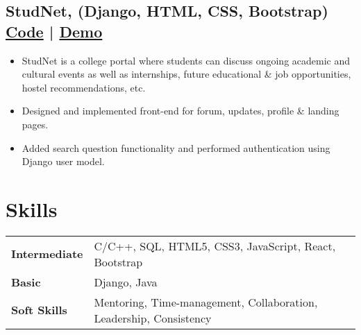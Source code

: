 \documentclass[a4,10pt]{article}
\newenvironment{zitemize}{
\begin{itemize}\itemsep0pt \parskip0pt \parsep1pt}
{\end{itemize}\vspace{-0.5cm}}
\newcommand{\hskills}[1]{
\textbf{\bfseries #1} }
\begin{document}
\subsection*{StudNet, {\normalsize\normalfont (Django, HTML, CSS, Bootstrap)} \hfill {\href{https://github.com/DevelopersLeague/StudNet}{Code} } | {\href{https://stud-net.herokuapp.com/}{Demo} }} 
    \begin{zitemize}
        \item StudNet is a college portal where students can discuss ongoing academic and cultural events as well as 
        internships, future educational \& job opportunities, hostel recommendations, etc. 
        \item Designed and implemented front-end for forum, updates, profile \& landing pages.
        \item Added search question functionality and performed authentication using Django user model.
    \end{zitemize}




\section{Skills}
\begin{tabular}{p{7em} p{48em}}
\hskills{Intermediate} &  C/C++, SQL, HTML5, CSS3, JavaScript, React, Bootstrap \\
\hskills{Basic} & Django, Java  \\
\hskills{Soft Skills} & Mentoring, Time-management, Collaboration, Leadership, Consistency
\end{tabular}
\vspace{-0.2cm}




\end{document}
